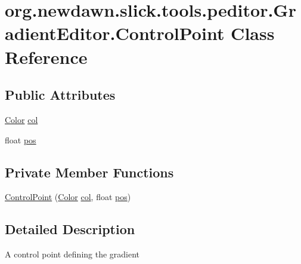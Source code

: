 \hypertarget{classorg_1_1newdawn_1_1slick_1_1tools_1_1peditor_1_1_gradient_editor_1_1_control_point}{}\section{org.\+newdawn.\+slick.\+tools.\+peditor.\+Gradient\+Editor.\+Control\+Point Class Reference}
\label{classorg_1_1newdawn_1_1slick_1_1tools_1_1peditor_1_1_gradient_editor_1_1_control_point}
\subsection*{Public Attributes}
\begin{DoxyCompactItemize}
\item 
\mbox{\hyperlink{classorg_1_1newdawn_1_1slick_1_1_color}{Color}} \mbox{\hyperlink{classorg_1_1newdawn_1_1slick_1_1tools_1_1peditor_1_1_gradient_editor_1_1_control_point_a330dad2b12917ff9c82aa59990bc3eaa}{col}}
\item 
float \mbox{\hyperlink{classorg_1_1newdawn_1_1slick_1_1tools_1_1peditor_1_1_gradient_editor_1_1_control_point_a2a1a00ff7fbc46c761def42eaf152fc2}{pos}}
\end{DoxyCompactItemize}
\subsection*{Private Member Functions}
\begin{DoxyCompactItemize}
\item 
\mbox{\hyperlink{classorg_1_1newdawn_1_1slick_1_1tools_1_1peditor_1_1_gradient_editor_1_1_control_point_aee184ebed8c7a4191926a3c16b9268ef}{Control\+Point}} (\mbox{\hyperlink{classorg_1_1newdawn_1_1slick_1_1_color}{Color}} \mbox{\hyperlink{classorg_1_1newdawn_1_1slick_1_1tools_1_1peditor_1_1_gradient_editor_1_1_control_point_a330dad2b12917ff9c82aa59990bc3eaa}{col}}, float \mbox{\hyperlink{classorg_1_1newdawn_1_1slick_1_1tools_1_1peditor_1_1_gradient_editor_1_1_control_point_a2a1a00ff7fbc46c761def42eaf152fc2}{pos}})
\end{DoxyCompactItemize}


\subsection{Detailed Description}
A control point defining the gradient


